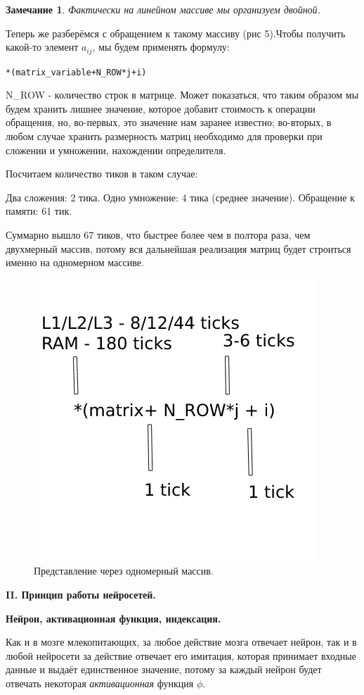 \documentclass[12pt]{extarticle}
\newtheorem*{remark}{Замечание}
\begin{document}
	\newpage
	
	\begin{remark}
		Фактически на линейном массиве мы организуем двойной.
	\end{remark}
	Теперь же разберёмся с обращением к такому массиву (рис 5).Чтобы получить какой-то элемент $a_{ij}$, мы будем применять формулу:
	
	\centerline{\texttt{*(matrix\_variable+N\_ROW*j+i)}}
	
	N\_ROW - количество строк в матрице. Может показаться, что таким образом мы будем хранить лишнее значение, которое добавит стоимость к операции обращения, но, во-первых, это значение нам заранее известно; во-вторых, в любом случае хранить размерность матриц необходимо для проверки при сложении и умножении, нахождении определителя.
	
	Посчитаем количество тиков в таком случае:
	
	Два сложения: 2 тика. 
	Одно умножение: 4 тика (среднее значение).
	Обращение к памяти: 61 тик. 
	
	Суммарно вышло 67 тиков, что быстрее более чем в полтора раза, чем двухмерный массив, потому вся дальнейшая реализация матриц будет строиться именно на одномерном массиве. 
		
	\begin{figure}[h]
			\centering
			\includegraphics[width=0.4\linewidth]{matrix_5.png}
			\caption{Представление через одномерный массив.}
			\label{fig:mpr}
	\end{figure}
	
	
	\newpage
	
	
		\centerline{\textbf{II. Принцип работы нейросетей.}}
				\centerline{\textbf{Нейрон, активационная функция, индексация.}}
	Как и в мозге млекопитающих, за любое действие мозга отвечает нейрон, так и в любой нейросети за действие отвечает его имитация, которая принимает входные данные и выдаёт единственное значение, потому за каждый нейрон будет отвечать некоторая \textit{активационная} функция $\phi$.
	
\end{document}
